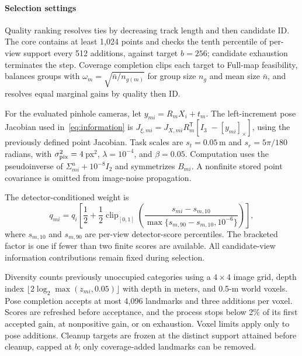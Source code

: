 \paragraph{Selection settings}
Quality ranking resolves ties by decreasing track length and then candidate ID. The core contains at least 1,024 points and checks the tenth percentile of per-view support every 512 additions, against target $b=256$; candidate exhaustion terminates the step. Coverage completion clips each target to Full-map feasibility, balances groups with $\omega_m=\sqrt{\bar n/n_{g(m)}}$ for group size $n_g$ and mean size $\bar n$, and resolves equal marginal gains by quality then ID.

For the evaluated pinhole cameras, let $y_{mi}=R_mX_i+t_m$. The left-increment pose Jacobian used in~\eqref{eq:information} is
$J_{\xi,mi}=J_{X,mi}R_m^\mathsf T[I_3\;- [y_{mi}]_\times]$,
using the previously defined point Jacobian. Task scales are $s_t=0.05$\,m and $s_r=5\pi/180$ radians, with $\sigma_{\rm pix}^2=4$\,px$^2$, $\lambda=10^{-4}$, and $\beta=0.05$. Computation uses the pseudoinverse of $\Sigma^u_{mi}+10^{-8}I_2$ and symmetrizes $B_{mi}$. A nonfinite stored point covariance is omitted from image-noise propagation.

The detector-conditioned weight is
\begin{equation}
q_{mi}=q_i\left[\frac12+\frac12\operatorname{clip}_{[0,1]}
\left(\frac{s_{mi}-s_{m,10}}{\max\{s_{m,90}-s_{m,10},10^{-6}\}}\right)\right],
\label{eq:detector_weight_implementation}
\end{equation}
where $s_{m,10}$ and $s_{m,90}$ are per-view detector-score percentiles. The bracketed factor is one if fewer than two finite scores are available. All candidate-view information contributions remain fixed during selection.

Diversity counts previously unoccupied categories using a $4\times4$ image grid, depth index $\lfloor2\log_2\max(z_{mi},0.05)\rfloor$ with depth in meters, and 0.5-m world voxels. Pose completion accepts at most 4,096 landmarks and three additions per voxel. Scores are refreshed before acceptance, and the process stops below 2\% of its first accepted gain, at nonpositive gain, or on exhaustion. Voxel limits apply only to pose additions. Cleanup targets are frozen at the distinct support attained before cleanup, capped at $b$; only coverage-added landmarks can be removed.

